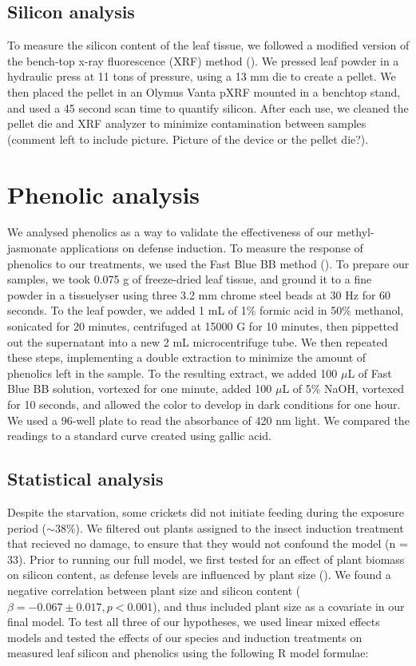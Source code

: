 \documentclass[12pt, letterpaper, ]{report}
\begin{document}
\subsection{Silicon analysis}

To measure the silicon content of the leaf tissue, we followed a modified version of the bench-top x-ray fluorescence (XRF) method (\cite{reidinger_rapid_2012}). We pressed leaf powder in a hydraulic press at 11 tons of pressure, using a 13 mm die to create a pellet. We then placed the pellet in an Olymus Vanta pXRF mounted in a benchtop stand, and used a 45 second scan time to quantify silicon. After each use, we cleaned the pellet die and XRF analyzer to minimize contamination between samples (comment left to include picture. Picture of the device or the pellet die?).

\section{Phenolic analysis}

We analysed phenolics as a way to validate the effectiveness of our methyl-jasmonate applications on defense induction. To measure the response of phenolics to our treatments, we used the Fast Blue BB method (\cite{pico2020systematic}). To prepare our samples, we took 0.075 g of freeze-dried leaf tissue, and ground it to a fine powder in a tissuelyser using three 3.2 mm chrome steel beads at 30 Hz for 60 seconds. To the leaf powder, we added 1 mL of 1\% formic acid in 50\% methanol, sonicated for 20 minutes, centrifuged at 15000 G for 10 minutes, then pippetted out the supernatant into a new 2 mL  microcentrifuge tube. We then repeated these steps, implementing a double extraction to minimize the amount of phenolics left in the sample. To the resulting extract, we added 100 $\mu$L of Fast Blue BB solution, vortexed for one minute, added 100 $\mu$L of 5\% NaOH, vortexed for 10 seconds, and allowed the color to develop in dark conditions for one hour. We used a 96-well plate to read the absorbance of 420 nm light. We compared the readings to a standard curve created using gallic acid. 

\subsection{Statistical analysis}

Despite the starvation, some crickets did not initiate feeding during the exposure period ($\sim38\%$). We filtered out plants assigned to the insect induction treatment that recieved no damage, to ensure that they would not confound the model (n = 33). Prior to running our full model, we first tested for an effect of plant biomass on silicon content, as defense levels are influenced by plant size (\cite{carmona_plant_2011}). We found a negative correlation between plant size and silicon content ($\beta = -0.067 \pm 0.017, p < 0.001$), and thus included plant size as a covariate in our final model. To test all three of our hypotheses, we used linear mixed effects models and tested the effects of our species and induction treatments on measured leaf silicon and phenolics using the following R model formulae:
\end{document}
